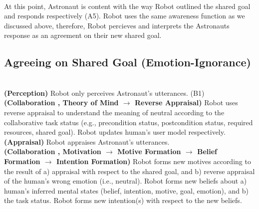 \noindent{}\\

At this point, Astronaut is content with the way Robot outlined the shared goal
and responds respectively (A5). Robot uses the same awareness function as we
discussed above, therefore, Robot percieves and interprets the Astronauts
response as an agreement on their new shared goal.\\

\noindent{}

\subsection{Agreeing on Shared Goal (Emotion-Ignorance)}
\label{sec:wt-exp2}

\noindent{}\\

\noindent\textbf{(Perception)} Robot only perceives Astronaut's utterances.
(B1)\\

\noindent\textbf{(Collaboration , Theory of Mind $\rightarrow$ Reverse
Appraisal)} Robot uses reverse appraisal to understand the meaning of neutral
according to the collaborative task status (e.g., precondition status,
postcondition status, required resources, shared goal). Robot updates human's
user model respectively.\\

\noindent\textbf{(Appraisal)} Robot appraises Astronaut's utterances.\\

\noindent\textbf{(Collaboration , Motivation $\rightarrow$ Motive Formation
$\rightarrow$ Belief Formation $\rightarrow$ Intention Formation)} Robot forms
new motives according to the result of a) appraisal with respect to the shared
goal, and b) reverse appraisal of the human's wrong emotion (i.e., neutral).
Robot forms new beliefs about a) human's inferred mental states (belief,
intention, motive, goal, emotion), and b) the task status. Robot forms new
intention(s) with respect to the new beliefs.\\

